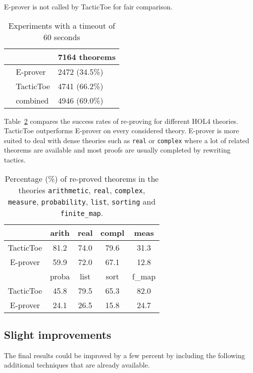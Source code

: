 \documentclass[runningheads,a4paper,draft]{svjour3}
\def\holfour{\textsf{HOL4}\xspace}
\def\eprover{\textsf{E-prover}\xspace}
\def\tactictoe{\textsf{TacticToe}\xspace}
\newcommand{\ra}[1]{\renewcommand{\arraystretch}{#1}}
\begin{document}
\eprover is not called by \tactictoe for fair comparison.



\begin{table}[h!]
\centering\ra{1.3}
\small
\begin{tabular}{lll}
\toprule
  & & 7164 theorems \\
\midrule
  & \eprover   & 2472 (34.5\%)\\ 
  & \tactictoe & 4741 (66.2\%)\\
  & combined   & 4946 (69.0\%)\\
\bottomrule
\end{tabular}
\caption{Experiments with a timeout of 60 seconds \label{tab:_param}}
\end{table}

Table~\ref{theories} compares the success rates of re-proving for different
\holfour theories. \tactictoe outperforms \eprover on every 
considered theory.
\eprover is more suited to deal with dense theories such as 
\texttt{real} or \texttt{complex} where a lot of related theorems are available 
and most proofs are usually completed by rewriting tactics.

\begin{table}[]
\centering
\setlength{\tabcolsep}{3mm}
\begin{tabular}{@{}ccccc@{}}
\toprule
\phantom{ab} & {arith} & {real} & {compl} & {meas} \\
\midrule
\tactictoe & 81.2 & 74.0 & 79.6 & 31.3\\
\eprover & 59.9 & 72.0 & 67.1 & 12.8\\
\midrule
\phantom{abc} & {proba} & {list} & {sort} & {f\_map} \\
\midrule
\tactictoe & 45.8 & 79.5 & 65.3 & 82.0 \\
\eprover & 24.1 & 26.5 & 15.8 & 24.7 \\
\bottomrule
\end{tabular}
\caption{\label{theories}Percentage (\%) of re-proved theorems in the theories 
\texttt{arithmetic}, \texttt{real}, \texttt{complex}, \texttt{measure},  
\texttt{probability}, \texttt{list}, \texttt{sorting} and \texttt{finite\_map}. 
}
\end{table}  

\subsection{Slight improvements}
The final results could be improved by a few percent by including the 
following additional techniques that are already available.
\end{document}

